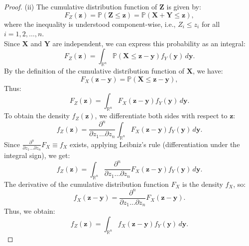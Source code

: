 \documentclass[a4paper,10pt]{article}
\theoremstyle{definition} %
\theoremstyle{definition} %
\theoremstyle{definition} %
\theoremstyle{definition} %
\newcommand{\0}{\boldsymbol{0}}
\begin{document}
\begin{proof}
(ii) The cumulative distribution function of $\mathbf{Z}$ is given by:
\begin{equation*}
F_Z(\mathbf{z}) = \mathbb{P}(\mathbf{Z} \leq \mathbf{z}) = \mathbb{P}(\mathbf{X} + \mathbf{Y} \leq \mathbf{z}),
\end{equation*}
where the inequality is understood component-wise, i.e., $Z_i \leq z_i$ for all $i = 1, 2, \dots, n$.
\\Since $\mathbf{X}$ and $\mathbf{Y}$ are independent, we can express this probability as an integral:
\begin{equation*}
F_Z(\mathbf{z}) = \int_{\mathbb{R}^n} \mathbb{P}(\mathbf{X} \leq \mathbf{z} - \mathbf{y}) f_Y(\mathbf{y}) \, d\mathbf{y}.
\end{equation*}
By the definition of the cumulative distribution function of $\mathbf{X}$, we have:
\begin{equation*}
F_X(\mathbf{z} - \mathbf{y}) = \mathbb{P}(\mathbf{X} \leq \mathbf{z} - \mathbf{y}),
\end{equation*}
Thus:
\begin{equation*}
F_Z(\mathbf{z}) = \int_{\mathbb{R}^n} F_X(\mathbf{z} - \mathbf{y}) f_Y(\mathbf{y}) \, d\mathbf{y}.
\end{equation*}
To obtain the density $f_Z(\mathbf{z})$, we differentiate both sides with respect to $\mathbf{z}$:
\begin{equation*}
f_Z(\mathbf{z}) = \frac{\partial^n}{\partial z_1 \dots \partial z_n} \int_{\mathbb{R}^n} F_X(\mathbf{z} - \mathbf{y}) f_Y(\mathbf{y}) \, d\mathbf{y}.
\end{equation*}
Since $\frac{\partial^n}{\partial z_1 \dots \partial z_n} F_X \equiv f_X$ exists, applying Leibniz's rule (differentiation under the integral sign), we get:
\begin{equation*}
f_Z(\mathbf{z}) = \int_{\mathbb{R}^n} \frac{\partial^n}{\partial z_1 \dots \partial z_n} F_X(\mathbf{z} - \mathbf{y}) f_Y(\mathbf{y}) \, d\mathbf{y}.
\end{equation*}
The derivative of the cumulative distribution function $F_X$ is the density $f_X$, so:
\begin{equation*}
f_X(\mathbf{z} - \mathbf{y}) = \frac{\partial^n}{\partial z_1 \dots \partial z_n} F_X(\mathbf{z} - \mathbf{y}).
\end{equation*}
Thus, we obtain:
\begin{equation*}
f_Z(\mathbf{z}) = \int_{\mathbb{R}^n} f_X(\mathbf{z} - \mathbf{y}) f_Y(\mathbf{y}) \, d\mathbf{y}.
\end{equation*}
\end{proof}
\end{document}
